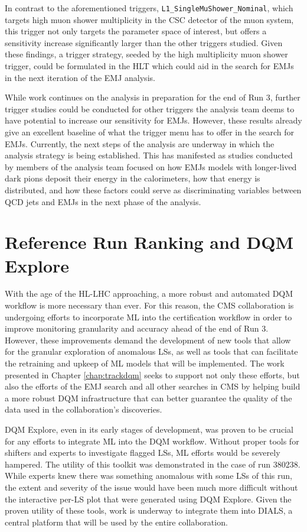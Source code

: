 In contrast to the aforementioned triggers, \texttt{L1\_SingleMuShower\_Nominal}, which targets high muon shower multiplicity in the CSC detector of the muon system, this trigger not only targets the parameter space of interest, but offers a sensitivity increase significantly larger than the other triggers studied. Given these findings, a trigger strategy, seeded by the high multiplicity muon shower trigger, could be formulated in the HLT which could aid in the search for EMJs in the next iteration of the EMJ analysis.

While work continues on the analysis in preparation for the end of Run 3, further trigger studies could be conducted for other triggers the analysis team deems to have potential to increase our sensitivity for EMJs. However, these results already give an excellent baseline of what the trigger menu has to offer in the search for EMJs. Currently, the next steps of the analysis are underway in which the analysis strategy is being established. This has manifested as studies conducted by members of the analysis team focused on how EMJs models with longer-lived dark pions deposit their energy in the calorimeters, how that energy is distributed, and how these factors could serve as discriminating variables between QCD jets and EMJs in the next phase of the analysis.

\section{Reference Run Ranking and DQM Explore}

With the age of the HL-LHC approaching, a more robust and automated DQM workflow is more necessary than ever. For this reason, the CMS collaboration is undergoing efforts to incorporate ML into the certification workflow in order to improve monitoring granularity and accuracy ahead of the end of Run 3. However, these improvements demand the development of new tools that allow for the granular exploration of anomalous LSs, as well as tools that can facilitate the retraining and upkeep of ML models that will be implemented. The work presented in Chapter \ref{chap:trackdqm} seeks to support not only these efforts, but also the efforts of the EMJ search and all other searches in CMS by helping build a more robust DQM infrastructure that can better guarantee the quality of the data used in the collaboration's discoveries.

DQM Explore, even in its early stages of development, was proven to be crucial for any efforts to integrate ML into the DQM workflow. Without proper tools for shifters and experts to investigate flagged LSs, ML efforts would be severely hampered. The utility of this toolkit was demonstrated in the case of run 380238. While experts knew there was something anomalous with some LSs of this run, the extent and severity of the issue would have been much more difficult without the interactive per-LS plot that were generated using DQM Explore. Given the proven utility of these tools, work is underway to integrate them into DIALS, a central platform that will be used by the entire collaboration.

